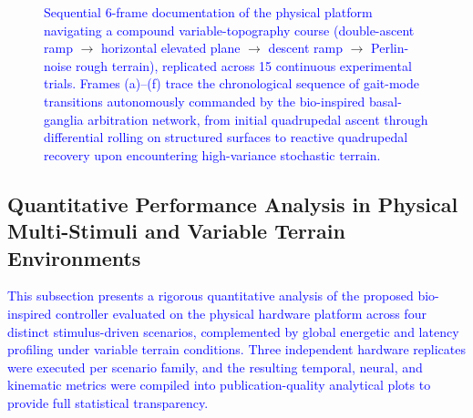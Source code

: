 \documentclass[preprint,12pt]{elsarticle}
\newcommand{\revblue}[1]{\textcolor{blue}{#1}}
\begin{document}
\begin{figure}[t]
  \caption{\revblue{Sequential 6-frame documentation of the physical platform navigating a compound variable-topography course (double-ascent ramp} $\rightarrow$ \revblue{horizontal elevated plane} $\rightarrow$ \revblue{descent ramp} $\rightarrow$ \revblue{Perlin-noise rough terrain), replicated across 15 continuous experimental trials. Frames (a)--(f) trace the chronological sequence of gait-mode transitions autonomously commanded by the bio-inspired basal-ganglia arbitration network, from initial quadrupedal ascent through differential rolling on structured surfaces to reactive quadrupedal recovery upon encountering high-variance stochastic terrain.}}
  \label{fig:real_variable_topography_sequence}
\end{figure}

\subsection{Quantitative Performance Analysis in Physical Multi-Stimuli and Variable Terrain Environments}
\label{ssec:QuantReal}

\revblue{This subsection presents a rigorous quantitative analysis of the proposed bio-inspired controller evaluated on the physical hardware platform across four distinct stimulus-driven scenarios, complemented by global energetic and latency profiling under variable terrain conditions. Three independent hardware replicates were executed per scenario family, and the resulting temporal, neural, and kinematic metrics were compiled into publication-quality analytical plots to provide full statistical transparency.}

\end{document}
